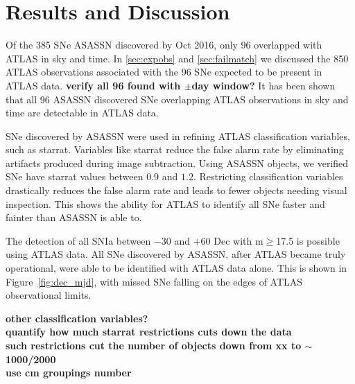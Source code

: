 \documentclass[aps,prb,twocolumn,superscriptaddress]{revtex4-1}
\begin{document}
\section{Results and Discussion}

\indent Of the 385 SNe ASASSN discovered by Oct 2016, only 96 overlapped
with ATLAS in sky and time.  
In \cref{sec:expobs} and \cref{sec:failmatch} we discussed the 850 
ATLAS observations associated with the 96 SNe expected to be 
present in ATLAS data.
{\bf verify all 96 found with $\pm$day window?}
It has been shown that all 96 ASASSN discovered SNe overlapping ATLAS 
observations in sky and time are detectable in ATLAS data.  

\indent SNe discovered by ASASSN were used in refining ATLAS classification 
variables, such as starrat.  Variables like starrat reduce the 
false alarm rate by eliminating artifacts produced during image 
subtraction.  Using ASASSN objects, we verified SNe have starrat values 
between $0.9$ and $1.2$.  
Restricting classification variables drastically reduces the false alarm rate and leads 
to fewer objects needing visual inspection. This shows the ability 
for ATLAS to identify all SNe faster and fainter than ASASSN is able to.

\indent The detection of all SNIa between $-30$ and 
$+60$ Dec with m$\geq$17.5 is possible using ATLAS data.  
All SNe discovered by ASASSN, after ATLAS became truly operational, were 
able to be identified with ATLAS data alone.  This is shown in 
Figure~\ref{fig:dec_mjd}, with missed SNe falling on the edges of ATLAS 
observational limits.


{\bf \noindent other classification variables?}\\
{\bf \noindent quantify how much starrat restrictions cuts down the data\\
\indent such restrictions cut the number of objects down from xx to $\sim$1000/2000\\
\indent use cm groupings number
}

\end{document}
